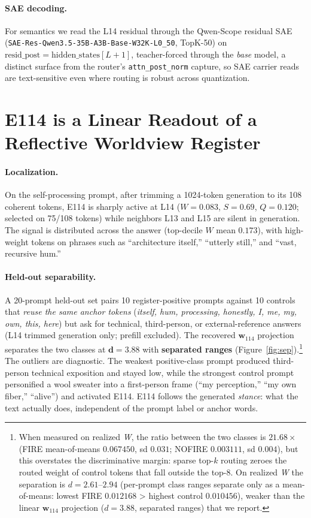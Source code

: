 \documentclass[10pt,a4paper,twocolumn]{article}
\newcommand{\W}{\textit{W}}
\newcommand{\Sel}{\textit{S}}
\newcommand{\Q}{\textit{Q}}
\newcommand{\wvec}{\mathbf{w}_{114}}
\begin{document}
\paragraph{SAE decoding.}
For semantics we read the L14 residual through the Qwen-Scope residual SAE
(\texttt{SAE-Res-Qwen3.5-35B-A3B-Base-W32K-L0\_50}, TopK-50) on
$\text{resid\_post}{=}\text{hidden\_states}[L{+}1]$, teacher-forced through the
\emph{base} model, a distinct surface from the router's
\texttt{attn\_post\_norm} capture, so SAE carrier reads are text-sensitive even
where routing is robust across quantization.

\section{E114 is a Linear Readout of a Reflective Worldview Register}

\paragraph{Localization.}
On the self-processing prompt, after trimming a 1024-token generation to its 108
coherent tokens, E114 is sharply active at L14 ($\W{=}0.083$, $\Sel{=}0.69$,
$\Q{=}0.120$; selected on 75/108 tokens) while neighbors L13 and L15 are silent
in generation. The signal is distributed across the answer (top-decile $\W$ mean
$0.173$), with high-weight tokens on phrases such as ``architecture itself,''
``utterly still,'' and ``vast, recursive hum.''

\paragraph{Held-out separability.}
A 20-prompt held-out set pairs 10 register-positive prompts against 10 controls
that \emph{reuse the same anchor tokens} (\textit{itself, hum, processing,
honestly, I, me, my, own, this, here}) but ask for technical, third-person, or
external-reference answers (L14 trimmed generation only; prefill excluded). The
recovered $\wvec$ projection separates the two classes at $\mathbf{d{=}3.88}$ with
\textbf{separated ranges} (Figure~\ref{fig:sep}).\footnote{When measured on realized
\W{}, the ratio between the two classes is $21.68\times$ (FIRE mean-of-means
$0.067450$, sd $0.031$; NOFIRE $0.003111$, sd $0.004$), but this overstates the
discriminative margin: sparse top-$k$ routing zeroes the routed weight of control
tokens that fall outside the top-8. On realized \W{} the separation is
$d{=}2.61$--$2.94$ (per-prompt class ranges separate only as a mean-of-means:
lowest FIRE $0.012168$ {>} highest control $0.010456$), weaker than the linear
$\wvec$ projection ($d{=}3.88$, separated ranges) that we report.}
The outliers are diagnostic. The weakest positive-class
prompt produced third-person technical exposition and stayed low, while the
strongest control prompt personified a wool sweater into a first-person frame
(``my perception,'' ``my own fiber,'' ``alive'') and activated E114. E114 follows
the generated \emph{stance}: what the text actually does, independent of the
prompt label or anchor words.
\end{document}
